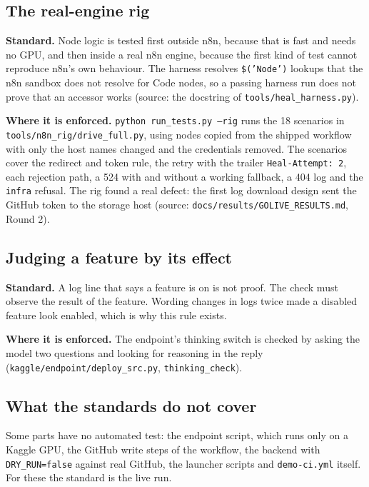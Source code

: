 \subsection{The real-engine rig}

\textbf{Standard.} Node logic is tested first outside n8n, because that is fast and needs no GPU, and then inside a real n8n engine, because the first kind of test cannot reproduce n8n's own behaviour. The harness resolves \texttt{\$('Node')} lookups that the n8n sandbox does not resolve for Code nodes, so a passing harness run does not prove that an accessor works (source: the docstring of \texttt{tools/\allowbreak{}heal\_\allowbreak{}harness.py}).

\textbf{Where it is enforced.} \texttt{python run\_tests.py --rig} runs the 18 scenarios in \texttt{tools/\allowbreak{}n8n\_\allowbreak{}rig/\allowbreak{}drive\_\allowbreak{}full.py}, using nodes copied from the shipped workflow with only the host names changed and the credentials removed. The scenarios cover the redirect and token rule, the retry with the trailer \texttt{Heal-Attempt: 2}, each rejection path, a 524 with and without a working fallback, a 404 log and the \texttt{infra} refusal. The rig found a real defect: the first log download design sent the GitHub token to the storage host (source: \texttt{docs/\allowbreak{}results/\allowbreak{}GOLIVE\_\allowbreak{}RESULTS.md}, Round 2).

\subsection{Judging a feature by its effect}

\textbf{Standard.} A log line that says a feature is on is not proof. The check must observe the result of the feature. Wording changes in logs twice made a disabled feature look enabled, which is why this rule exists.

\textbf{Where it is enforced.} The endpoint's thinking switch is checked by asking the model two questions and looking for reasoning in the reply (\texttt{kaggle/\allowbreak{}endpoint/\allowbreak{}deploy\_\allowbreak{}src.py}, \texttt{thinking\_check}).

\subsection{What the standards do not cover}

Some parts have no automated test: the endpoint script, which runs only on a Kaggle GPU, the GitHub write steps of the workflow, the backend with \texttt{DRY\_RUN=false} against real GitHub, the launcher scripts and \texttt{demo-ci.yml} itself. For these the standard is the live run.
